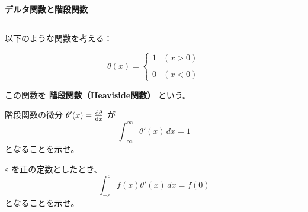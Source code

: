 \documentclass[uplatex,dvipdfmx,11pt]{jsarticle}
\begin{document}
\begin{center}
  {\LARGE \textbf{デルタ関数と階段関数}} \\[1ex]
  \rule{0.9\linewidth}{0.5pt}
\end{center}

以下のような関数を考える：

\begin{equation}
\theta(x) = 
\begin{cases}
  1 & (x > 0) \\\\
  0 & (x < 0)
\end{cases}
\end{equation}

この関数を \textbf{階段関数（Heaviside関数）} という。

\vspace{1em}


\begin{tcolorbox}[
  colframe=green!50!black,
  colback=green!5!white,
  title=(b) $\theta'(x)$ の積分値
]

階段関数の微分 $\theta'(x) = \dv{\theta}{x}$ が
\begin{equation} \tag{2}
  \int_{-\infty}^{\infty} \theta'(x) \, dx = 1
\end{equation}
となることを示せ。
\end{tcolorbox}

\vspace{1em}

\begin{tcolorbox}[
  colframe=green!50!black,
  colback=green!5!white,
  title=(b) $\delta(x)$ と関数への作用
]
$\varepsilon$ を正の定数としたとき、
\begin{equation} \tag{3}
  \int_{-\varepsilon}^{\varepsilon} f(x) \theta'(x) \, dx = f(0)
\end{equation}
となることを示せ。
\end{tcolorbox}

\vspace{1em}
\end{document}
